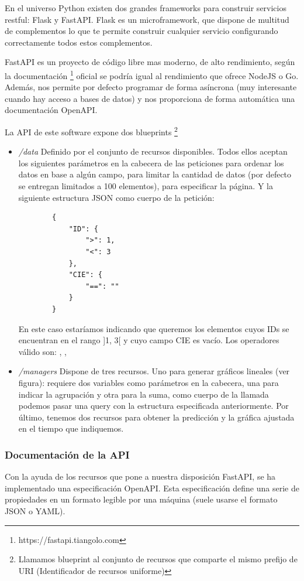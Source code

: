 En el universo Python existen dos grandes frameworks para construir servicios restful: Flask y FastAPI.
Flask es un microframework, que dispone de multitud de complementos lo que te permite construir cualquier servicio configurando correctamente todos estos complementos. 

FastAPI es un proyecto de código libre mas moderno, de alto rendimiento, según la documentación \footnote{https://fastapi.tiangolo.com} oficial se podría igual al rendimiento que ofrece NodeJS o Go. Además, nos permite por defecto programar de forma asíncrona (muy interesante cuando hay acceso a bases de datos) y nos proporciona de forma automática una documentación OpenAPI.

La API de este software expone dos blueprints \footnote{Llamamos blueprint al conjunto de recursos que comparte el mismo prefijo de URI (Identificador de recursos uniforme)}

\begin{itemize}
    \item \textit{/data} Definido por el conjunto de recursos disponibles. Todos ellos aceptan los siguientes parámetros en la cabecera de las peticiones  para ordenar los datos en base a algún campo,  para limitar la cantidad de datos (por defecto se entregan limitados a 100 elementos),  para especificar la página.
    Y la siguiente estructura JSON como cuerpo de la petición:
    \begin{verbatim}
        {
            "ID": {
                ">": 1,
                "<": 3
            },
            "CIE": {
                "==": ""
            }
        }
    \end{verbatim}
    En este caso estaríamos indicando que queremos los elementos cuyos IDs se encuentran en el rango ]1, 3[ y cuyo campo CIE es vacío. Los operadores válido son: \codeword{==}, \codeword{<}, \codeword{>}

    \item \textit{/managers} Dispone de tres recursos. Uno para generar gráficos lineales (ver figura): requiere dos variables como parámetros en la cabecera, una para indicar la agrupación y otra para la suma, como cuerpo de la llamada podemos pasar una query con la estructura especificada anteriormente. Por último, tenemos dos recursos para obtener la predicción y la gráfica ajustada en el tiempo que indiquemos.
\end{itemize}

\subsubsection{Documentación de la API}
Con la ayuda de los recursos que pone a nuestra disposición FastAPI, se ha implementado una especificación OpenAPI. Esta especificación define una serie de propiedades en un formato legible por una máquina (suele usarse el formato JSON o YAML).

